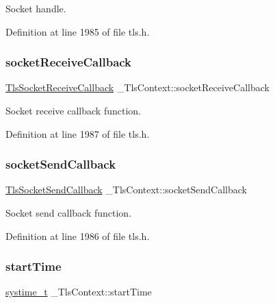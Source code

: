 Socket handle. 



Definition at line 1985 of file tls.\+h.

\mbox{\label{struct__TlsContext_afa3aee1f8a07123f871eaf9c13802785}} 
\subsubsection{\texorpdfstring{socket\+Receive\+Callback}{socketReceiveCallback}}
{\footnotesize\ttfamily \hyperlink{tls_8h_a4588e69c3d9708c560b24ea04afa6a9c}{Tls\+Socket\+Receive\+Callback} \+\_\+\+Tls\+Context\+::socket\+Receive\+Callback}



Socket receive callback function. 



Definition at line 1987 of file tls.\+h.

\mbox{\label{struct__TlsContext_aaea9cdf8a35e56cdc94457ed81f8843a}} 
\subsubsection{\texorpdfstring{socket\+Send\+Callback}{socketSendCallback}}
{\footnotesize\ttfamily \hyperlink{tls_8h_a2d3369746cfcc1ff0830302cecea54ce}{Tls\+Socket\+Send\+Callback} \+\_\+\+Tls\+Context\+::socket\+Send\+Callback}



Socket send callback function. 



Definition at line 1986 of file tls.\+h.

\mbox{\label{struct__TlsContext_af85f4521169c854562c70c1ee9f10144}} 
\subsubsection{\texorpdfstring{start\+Time}{startTime}}
{\footnotesize\ttfamily \hyperlink{compiler__port_8h_ae3e32a98d431a02106616da3071832dd}{systime\+\_\+t} \+\_\+\+Tls\+Context\+::start\+Time}



